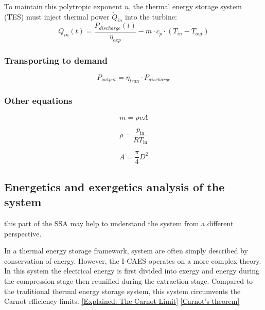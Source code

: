 \vspace{1em}

To maintain this polytropic exponent $n$, the thermal energy storage system (TES) must inject thermal power $\dot{Q}_{in}$ into the turbine:
\begin{equation}
\dot{Q}_{in}(t) = \frac{P_{discharge}(t)}{\eta_{exp}} - \dot{m} \cdot c_p \cdot (T_{in} - T_{out})
\end{equation}

\subsubsection{Transporting to demand}
\begin{equation}
    P_{output}=\eta_{tran} \cdot P_{discharge}
\end{equation}

\subsubsection{Other equations}
\begin{equation}
\dot{m} = \rho v A
\end{equation}

\begin{equation}
\rho = \frac{p_{\text{in}}}{R T_{\text{in}}}
\end{equation}

\begin{equation}
A = \frac{\pi}{4} D^2
\end{equation}
 

\subsection{Energetics and exergetics analysis of the system}
 this part of the SSA may help to understand the system from a different perspective. 

 \vspace{1em}
In a thermal energy storage framework, system are often simply described by conservation of energy. However, the I-CAES operates on a more complex theory. In this system the electrical energy is first divided into exergy and energy during the compression stage then reunified during the extraction stage. Compared to the traditional thermal energy storage system, this system circumvents the Carnot efficiency limits. \href{https://news.mit.edu/2010/explained-carnot-0519}{[Explained: The Carnot Limit]} \href{https://en.wikipedia.org/wiki/Carnot%27s_theorem_(thermodynamics)0}{[Carnot's theorem]}

